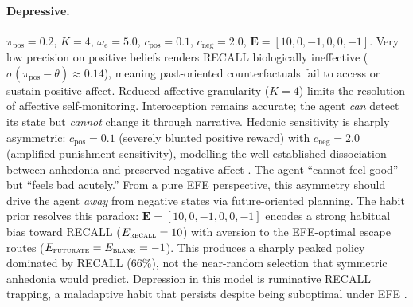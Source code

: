 \documentclass[11pt,a4paper]{article}
\begin{document}
\paragraph{Depressive.} $\pi_{\text{pos}} = 0.2$, $K = 4$, $\omega_e = 5.0$, $c_{\text{pos}} = 0.1$, $c_{\text{neg}} = 2.0$, $\mathbf{E} = [10, 0, -1, 0, 0, -1]$. Very low precision on positive beliefs renders RECALL biologically ineffective ($\sigma(\pi_{\text{pos}} - \theta) \approx 0.14$), meaning past-oriented counterfactuals fail to access or sustain positive affect. Reduced affective granularity ($K{=}4$) limits the resolution of affective self-monitoring. Interoception remains accurate; the agent \emph{can} detect its state but \emph{cannot} change it through narrative. Hedonic sensitivity is sharply asymmetric: $c_{\text{pos}} = 0.1$ (severely blunted positive reward) with $c_{\text{neg}} = 2.0$ (amplified punishment sensitivity), modelling the well-established dissociation between anhedonia and preserved negative affect \citep{pizzagalli2014depression}. The agent ``cannot feel good'' but ``feels bad acutely.'' From a pure EFE perspective, this asymmetry should drive the agent \emph{away} from negative states via future-oriented planning. The habit prior resolves this paradox: $\mathbf{E} = [10, 0, -1, 0, 0, -1]$ encodes a strong habitual bias toward RECALL ($E_{\textsc{recall}} = 10$) with aversion to the EFE-optimal escape routes ($E_{\textsc{futurate}} = E_{\textsc{blank}} = -1$). This produces a sharply peaked policy dominated by RECALL (66\%), not the near-random selection that symmetric anhedonia would predict. Depression in this model is ruminative RECALL trapping, a maladaptive habit that persists despite being suboptimal under EFE \citep{nolenhoeksema1991responses, watkins2008constructive}.
\end{document}
